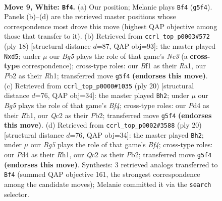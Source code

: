 \documentclass[11pt]{article}
\begin{document}
\clearpage

\begin{figure}[p]\centering
\begin{subfigure}{0.46\textwidth}\centering
\resizebox{\linewidth}{!}{%
\newchessgame
\chessboard[
  setfen={rnbq1rk1/pp2bppp/2p5/3p2B1/3P2n1/2N1P3/PPQ1NPPP/R3KB1R w KQ - 4 9},
  showmover=false,
  pgfstyle=straightmove, color=movearrow, markmove={g5-f4}
]}
\caption{}
\end{subfigure}\hfill
\begin{subfigure}{0.46\textwidth}\centering
\resizebox{\linewidth}{!}{%
\newchessgame
\chessboard[
  setfen={rnbq1rk1/pp3pb1/3p1npp/2pp4/2P1P2B/2NB4/PP2NPPP/R2QK2R w KQ - 0 10},
  showmover=false,
  pgfstyle=straightmove, color=movearrow, markmove={c3-d5}
]}
\caption{}
\end{subfigure}
\\[4pt]
\begin{subfigure}{0.46\textwidth}\centering
\resizebox{\linewidth}{!}{%
\newchessgame
\chessboard[
  setfen={rn1q1rk1/pb2ppbp/3p2p1/2p4n/4PB2/2PB1N1P/PPQN1PP1/R3K2R w KQ - 2 11},
  showmover=false,
  pgfstyle=straightmove, color=movearrow, markmove={f4-h2}
]}
\caption{}
\end{subfigure}\hfill
\begin{subfigure}{0.46\textwidth}\centering
\resizebox{\linewidth}{!}{%
\newchessgame
\chessboard[
  setfen={rn1q1rk1/pb2ppbp/3p2p1/2p4n/4PB2/2PB1N1P/PPQN1PP1/R3K2R w KQ - 2 11},
  showmover=false,
  pgfstyle=straightmove, color=movearrow, markmove={f4-h2}
]}
\caption{}
\end{subfigure}
\caption{\textbf{Move 9, White: \texttt{Bf4}.} (a) Our position; Melanie plays \texttt{Bf4} (\texttt{g5f4}). Panels (b)--(d) are the retrieved master positions whose correspondence most drove this move (highest QAP objective among those that transfer to it). (b) Retrieved from \texttt{ccrl\_top\_p0003\#572} (ply 18) [structural distance $d$=87, QAP obj=93]: the master played \texttt{Nxd5}; under $\mu$ our \emph{Bg5} plays the role of that game's \emph{Nc3} (a \textbf{cross-type} correspondence); cross-type roles: our \emph{B}f1 as their \emph{R}a1, our \emph{P}b2 as their \emph{R}h1; transferred move \texttt{g5f4} \textbf{(endorses this move)}. (c) Retrieved from \texttt{ccrl\_top\_p0000\#1035} (ply 20) [structural distance $d$=76, QAP obj=34]: the master played \texttt{Bh2}; under $\mu$ our \emph{Bg5} plays the role of that game's \emph{Bf4}; cross-type roles: our \emph{P}d4 as their \emph{R}h1, our \emph{Q}c2 as their \emph{P}b2; transferred move \texttt{g5f4} \textbf{(endorses this move)}. (d) Retrieved from \texttt{ccrl\_top\_p0002\#3588} (ply 20) [structural distance $d$=76, QAP obj=34]: the master played \texttt{Bh2}; under $\mu$ our \emph{Bg5} plays the role of that game's \emph{Bf4}; cross-type roles: our \emph{P}d4 as their \emph{R}h1, our \emph{Q}c2 as their \emph{P}b2; transferred move \texttt{g5f4} \textbf{(endorses this move)}. Synthesis: 3 retrieved analogs transferred to \texttt{Bf4} (summed QAP objective 161, the strongest correspondence among the candidate moves); Melanie committed it via the \texttt{search} selector.}
\label{fig:thought-m16}
\end{figure}
\end{document}
